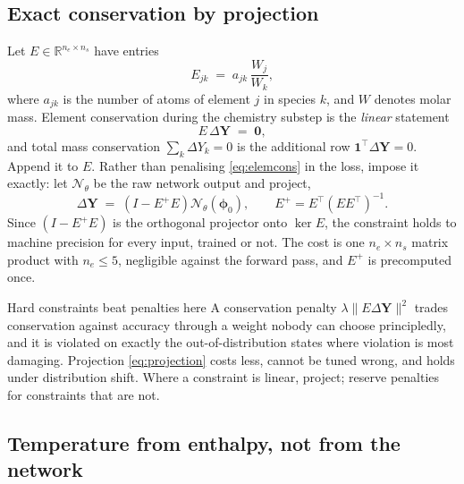\documentclass[11pt]{article}
\newcommand{\R}{\mathbb{R}}
\newcommand{\vv}[1]{\bm{#1}}
\newcommand{\Yv}{\vv{Y}}
\newcommand{\phiv}{\vv{\phi}}
\newcommand{\Net}{\mathcal{N}}
\theoremstyle{plain}
\theoremstyle{definition}
\begin{document}
\subsection{Exact conservation by projection}

Let $E\in\R^{n_e\times n_s}$ have entries
\begin{equation}
E_{jk} \;=\; a_{jk}\,\frac{W_j}{W_k},
\end{equation}
where $a_{jk}$ is the number of atoms of element $j$ in species $k$, and $W$
denotes molar mass. Element conservation during the chemistry substep is the
\emph{linear} statement
\begin{equation}
E\,\Delta\Yv \;=\; \vv{0},
\label{eq:elemcons}
\end{equation}
and total mass conservation $\sum_k \Delta Y_k = 0$ is the additional row
$\vv{1}^{\!\top}\Delta\Yv=0$. Append it to $E$. Rather than penalising
\eqref{eq:elemcons} in the loss, impose it exactly: let $\Net_\theta$ be the
raw network output and project,
\begin{equation}
\boxed{\;
\Delta\Yv \;=\; \left(I - E^{+}E\right)\Net_\theta(\phiv_0),
\qquad E^{+}=E^{\!\top}(EE^{\!\top})^{-1}.
\;}
\label{eq:projection}
\end{equation}
Since $\left(I-E^{+}E\right)$ is the orthogonal projector onto $\ker E$, the
constraint holds to machine precision for every input, trained or not. The cost
is one $n_e\times n_s$ matrix product with $n_e\le5$, negligible against the
forward pass, and $E^{+}$ is precomputed once.

\begin{engbox}{Hard constraints beat penalties here}
A conservation penalty $\lambda\|E\Delta\Yv\|^2$ trades conservation against
accuracy through a weight nobody can choose principledly, and it is violated on
exactly the out-of-distribution states where violation is most damaging.
Projection \eqref{eq:projection} costs less, cannot be tuned wrong, and holds
under distribution shift. Where a constraint is linear, project; reserve
penalties for constraints that are not.
\end{engbox}

\subsection{Temperature from enthalpy, not from the network}
\end{document}
